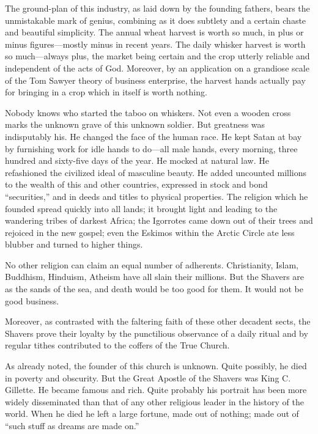 \documentclass[twoside,nohyper,openany,nobib]{tufte-book}
\begin{document}
The ground-plan of this industry, as laid down by the founding fathers,
bears the unmistakable mark of genius, combining as it does subtlety and
a certain chaste and beautiful simplicity. The annual wheat harvest is
worth so much, in plus or minus figures---mostly minus in recent years.
The daily whisker harvest is worth so much---always plus, the market
being certain and the crop utterly reliable and independent of the acts
of God. Moreover, by an application on a grandiose scale of the Tom
Sawyer theory of business enterprise, the harvest hands actually pay for
bringing in a crop which in itself is worth nothing.

Nobody knows who started the taboo on whiskers. Not even a wooden cross
marks the unknown grave of this unknown soldier. But greatness was
indisputably his. He changed the face of the human race. He kept Satan
at bay by furnishing work for idle hands to do---all male hands, every
morning, three hundred and sixty-five days of the year. He mocked at
natural law. He refashioned the civilized ideal of masculine beauty. He
added uncounted millions to the wealth of this and other countries,
expressed in stock and bond ``securities,'' and in deeds and titles to
physical properties. The religion which he founded spread quickly into
all lands; it brought light and leading to the wandering tribes of
darkest Africa; the Igorrotes came down out of their trees and rejoiced
in the new gospel; even the Eskimos within the Arctic Circle ate less
blubber and turned to higher things.

No other religion can claim an equal number of adherents. Christianity,
Islam, Buddhism, Hinduism, Atheism have all slain their millions. But
the Shavers are as the sands of the sea, and death would be too good for
them. It would not be good business.

Moreover, as contrasted with the faltering faith of these other decadent
sects, the Shavers prove their loyalty by the punctilious observance of
a daily ritual and by regular tithes contributed to the coffers of the
True Church.

As already noted, the founder of this church is unknown. Quite possibly,
he died in poverty and obscurity. But the Great Apostle of the Shavers
was King C. Gillette. He became famous and rich. Quite probably his
portrait has been more widely disseminated than that of any other
religious leader in the history of the world. When he died he left a
large fortune, made out of nothing; made out of ``such stuff as dreams
are made on.''
\end{document}
